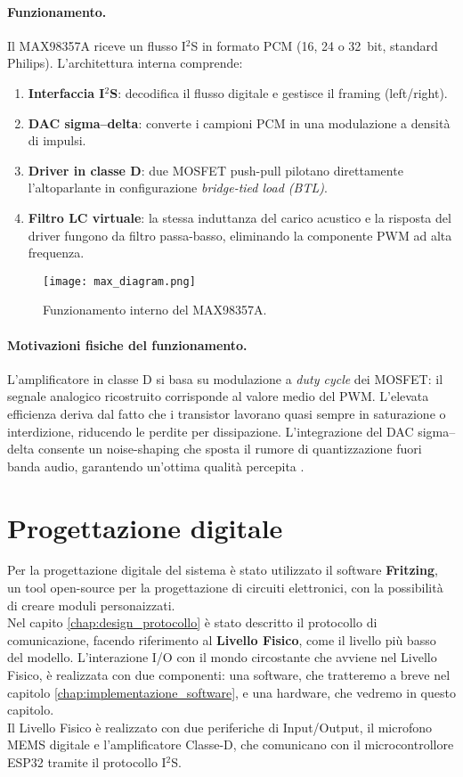 \paragraph{Funzionamento.}
Il MAX98357A riceve un flusso I$^2$S in formato PCM (\SI{16}{}, \SI{24}{} o \SI{32}{bit}, standard Philips). L’architettura interna comprende:
\begin{enumerate}
  \item \textbf{Interfaccia I$^2$S}: decodifica il flusso digitale e gestisce il framing (left/right).
  \item \textbf{DAC sigma–delta}: converte i campioni PCM in una modulazione a densità di impulsi.
  \item \textbf{Driver in classe D}: due MOSFET push-pull pilotano direttamente l’altoparlante in configurazione \emph{bridge-tied load (BTL)}.
  \item \textbf{Filtro LC virtuale}: la stessa induttanza del carico acustico e la risposta del driver fungono da filtro passa-basso, eliminando la componente PWM ad alta frequenza.
\end{enumerate}
\begin{figure}[H]
  \centering
  \texttt{[image: max\_diagram.png]}
  \caption{Funzionamento interno del MAX98357A.}
  \label{fig:max_diagram}
  \end{figure}
\paragraph{Motivazioni fisiche del funzionamento.}
L’amplificatore in classe D si basa su modulazione a \emph{duty cycle} dei MOSFET: il segnale analogico ricostruito corrisponde al valore medio del PWM. L’elevata efficienza deriva dal fatto che i transistor lavorano quasi sempre in saturazione o interdizione, riducendo le perdite per dissipazione. L’integrazione del DAC sigma–delta consente un noise-shaping che sposta il rumore di quantizzazione fuori banda audio, garantendo un’ottima qualità percepita \cite{texas-classd}.

\section{Progettazione digitale}
Per la progettazione digitale del sistema è stato utilizzato il software \textbf{Fritzing}, un tool open-source
per la progettazione di circuiti elettronici, con la possibilità di creare moduli personaizzati.\\
Nel capito \ref{chap:design_protocollo} è stato descritto il protocollo di comunicazione, facendo riferimento al \textbf{Livello Fisico},
come il livello più basso del modello. L'interazione I/O con il mondo circostante che avviene nel Livello Fisico, è realizzata con due componenti: una software, 
che tratteremo a breve nel capitolo \ref{chap:implementazione_software}, e una hardware, che vedremo in questo capitolo.\\
Il Livello Fisico è realizzato con due periferiche di Input/Output, il microfono MEMS digitale e l'amplificatore Classe-D, che comunicano con il microcontrollore ESP32
 tramite il protocollo I$^2$S.\\

